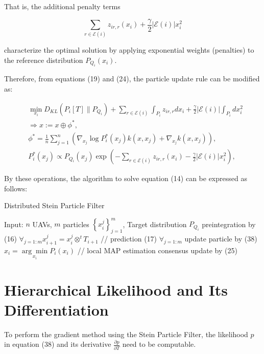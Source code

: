 \documentclass[a4paper,fleqn,10pt,twocolumn]{SICE_ISCS}
\begin{document}
That is, the additional penalty terms

\begin{equation}
\sum_{r \in \mathcal{E}(i)} z_{i r, r}\left(x_{i}\right)+\frac{\gamma}{2}|\mathcal{E}(i)| x_{i}^{2}
\end{equation}

characterize the optimal solution by applying exponential weights (penalties) to the reference distribution $P_{Q_{i}}\left(x_{i}\right)$.

Therefore, from equations (19) and (24), the particle update rule can be modified as:

\begin{equation}
\begin{aligned}
& \min _{x_{i}} D_{K L}\left(P_{i}[T] \| P_{Q_{i}}\right)+\sum_{r \in \mathcal{E}(i)} \int_{P_{i}} z_{i r, r} d x_{i}+\frac{\gamma}{2}|\mathcal{E}(i)| \int_{P_{i}} d x_{i}^{2} \\
& \Rightarrow x:=x \oplus \phi^{*}, \\
& \phi^{*}=\frac{1}{n} \sum_{j=1}^{n}\left(\nabla_{x_{j}} \log P_{i}^{*}\left(x_{j}\right) k\left(x, x_{j}\right)+\nabla_{x_{j}} k\left(x, x_{j}\right)\right), \\
& P_{i}^{*}\left(x_{j}\right) \propto P_{Q_{i}}\left(x_{j}\right) \exp \left(-\sum_{r \in \mathcal{E}(i)} z_{i r, r}\left(x_{i}\right)-\frac{\gamma}{2}|\mathcal{E}(i)| x_{i}^{2}\right),
\end{aligned}
\end{equation}

By these operations, the algorithm to solve equation (14) can be expressed as follows:

\begin{algorithm}
\caption{Distributed Stein Particle Filter}
\begin{algorithmic}[1]
\STATE Input: $n$ UAVs, $m$ particles $\left\{x_{i}^{j}\right\}_{j=1}^{m}$, Target distribution $P_{Q_{i}}$
\STATE preintegration by (16)
\ENDFOR
\STATE $\forall_{j=1:m} x_{i+1}^{j}=x_{i}^{j} \otimes^{t} T_{i+1}$ // prediction (17)
\STATE $\forall_{j=1:m}$ update particle by (38)
\STATE $x_{i}=\underset{x_{i}}{\arg \min } P_{i}\left(x_{i}\right)$ // local MAP estimation
\STATE consensus update by (25)
\ENDFOR
\end{algorithmic}
\end{algorithm}

\section{Hierarchical Likelihood and Its Differentiation}
To perform the gradient method using the Stein Particle Filter, the likelihood $p$ in equation (38) and its derivative $\frac{\partial p}{\partial T}$ need to be computable.
\end{document}
